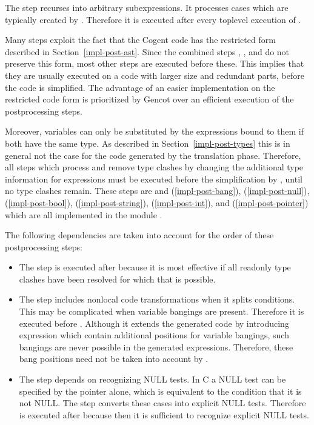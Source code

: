 The  step recurses into arbitrary subexpressions. It processes cases which are typically created by .
Therefore it is executed after every toplevel execution of .

Many steps exploit the fact that the Cogent code has the restricted form described in Section~\ref{impl-post-ast}. Since the combined
steps , , and  do not preserve this form, most other steps are executed before these. This
implies that they are usually executed on a code with larger size and redundant parts, before the code is simplified. The advantage
of an easier implementation on the restricted code form is prioritized by Gencot over an efficient execution of the postprocessing steps.

Moreover, variables can only be substituted by the expressions bound to them if both have the same type. As described in
Section~\ref{impl-post-types} this is in general not the case for the code generated by the translation phase. Therefore, all steps
which process and remove type clashes by changing the additional type information for expressions must be executed before the
simplification by , until no type clashes remain. These steps are  and  (\ref{impl-post-bang}),
 (\ref{impl-post-null}),  (\ref{impl-post-bool}),  (\ref{impl-post-string}),
 (\ref{impl-post-int}), and  (\ref{impl-post-pointer}) which are all implemented in the module
.

The following dependencies are taken into account for the order of these postprocessing steps:
\begin{itemize}
\item The  step is executed after  because it is most effective if all readonly type clashes
have been resolved for which that is possible.
\item The  step includes nonlocal code transformations when it splits conditions. This may be complicated when
variable bangings are present. Therefore it is executed before . Although it extends the generated code by introducing
 expression which contain additional positions for variable bangings, such bangings are never possible in the generated
 expressions. Therefore, these bang positions need not be taken into account by .
\item The  step depends on recognizing NULL tests. In C a NULL test can be specified by the pointer alone, which
is equivalent to the condition that it is not NULL. The  step converts these cases into explicit NULL tests. Therefore
 is executed after  because then it is sufficient to recognize explicit NULL tests.
\end{itemize}

